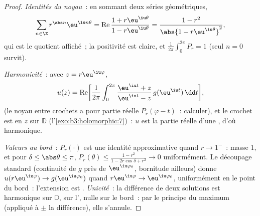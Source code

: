 \begin{proof}
\emph{Identités du noyau}~: en sommant deux séries
géométriques,
\[
\sum_{n\in\Z}r^{\abs n}\eu^{\iu n\theta}
= \operatorname{Re}\frac{1 + r\eu^{\iu\theta}}{1 -
r\eu^{\iu\theta}}
= \frac{1 - r^2}{\abs{1 - r\eu^{\iu\theta}}^2},
\]
qui est le quotient affiché~; la positivité est claire, et
$\frac1{2\pi}\int_0^{2\pi}P_r = 1$ (seul $n = 0$ survit).

\emph{Harmonicité}~: avec $z = r\eu^{\iu\varphi}$,
\[
u(z) = \operatorname{Re}\biggl[\frac1{2\pi}\int_0^{2\pi}
\frac{\eu^{\iu t} + z}{\eu^{\iu t} - z}\,
g(\eu^{\iu t})\,\dd t\biggr],
\]
(le noyau entre crochets a pour partie réelle $P_r(\varphi -
t)$~: calculer), et le crochet est  en $z$ sur
$\mathbb D$ (l'\cref{exo:b3:holomorphic:7})~: $u$ est la
partie réelle d'une , d'où harmonique.

\emph{Valeurs au bord}~: $P_r(\cdot)$ est une identité
approximative quand $r \to 1^-$~: masse $1$, et pour $\delta
\leq \abs\theta \leq \pi$, $P_r(\theta) \leq \frac{1 -
r^2}{1 - 2r\cos\delta + r^2} \to 0$ uniformément. Le
découpage standard (continuité de $g$ près de
$\eu^{\iu\varphi_0}$, bornitude ailleurs) donne
$u(r\eu^{\iu\varphi}) \to g(\eu^{\iu\varphi_0})$ quand
$r\eu^{\iu\varphi} \to \eu^{\iu\varphi_0}$, uniformément en
le point du bord~: l'extension est . \emph{Unicité}~:
la différence de deux solutions est harmonique sur $\mathbb
D$,  sur l', nulle sur le bord~: par le
principe du maximum (appliqué à $\pm$ la différence), elle
s'annule.
\end{proof}

